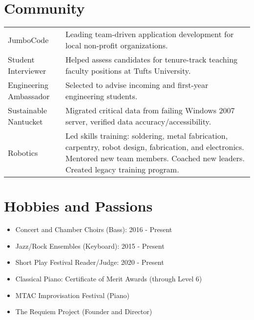 \documentclass[letter,10pt]{article}
\begin{document}
\section{Community}
\begin{tabularx}{\linewidth}{@{}l X@{}}	
    JumboCode & Leading team-driven application development for local non-profit organizations. \\[2.75pt]
    Student Interviewer & Helped assess candidates for tenure-track teaching faculty positions at Tufts University. \\[2.75pt]
    Engineering Ambassador & Selected to advise incoming and first-year engineering students. \\[2.75pt]
    Sustainable Nantucket & Migrated critical data from failing Windows 2007 server, verified data accuracy/accessibility. \\[2.75pt]
    Robotics & Led skills training: soldering, metal fabrication, carpentry, robot design, fabrication, and electronics. Mentored new team members. Coached new leaders. Created legacy training program.
\end{tabularx}

\section{Hobbies and Passions}
\begin{itemize}
    \item Concert and Chamber Choirs (Bass): 2016 - Present
    \item Jazz/Rock Ensembles (Keyboard): 2015 - Present
    \item Short Play Festival Reader/Judge: 2020 - Present
    \item Classical Piano: Certificate of Merit Awards (through Level 6)
    \item MTAC Improvisation Festival (Piano)
    \item The Requiem Project (Founder and Director)
\end{itemize}



\end{document}
